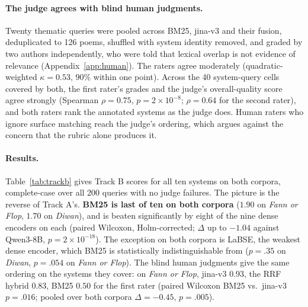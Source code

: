 \paragraph{The judge agrees with blind human judgments.} Twenty thematic queries were pooled across
BM25, jina-v3 and their fusion, deduplicated to 126 poems, shuffled with system identity removed,
and graded by two authors independently, who were told that lexical overlap is not evidence of
relevance (Appendix~\ref{app:human}). The raters agree moderately (quadratic-weighted
$\kappa{=}0.53$, $90\%$ within one point). Across the 40 system-query cells covered by both, the
first rater's grades and the judge's overall-quality score agree strongly (Spearman $\rho{=}0.75$,
$p{=}2\times10^{-8}$; $\rho{=}0.64$ for the second rater), and both raters rank the annotated
systems as the judge does. Human raters who ignore surface matching reach the judge's ordering,
which argues against the concern that the rubric alone produces it.

\paragraph{Results.} Table~\ref{tab:trackb} gives Track B scores for all ten systems on both
corpora, complete-case over all 200 queries with no judge failures. The picture is the reverse of
Track A's. \textbf{BM25 is last of ten on both corpora} ($1.90$ on \textit{Fann or Flop}, $1.70$ on
\textit{Diwan}), and is beaten significantly by eight of the nine dense encoders on each (paired
Wilcoxon, Holm-corrected; $\Delta$ up to $-1.04$ against Qwen3-8B, $p{=}2\times10^{-18}$). The
exception on both corpora is LaBSE, the weakest dense encoder, which BM25 is statistically
indistinguishable from ($p{=}.35$ on \textit{Diwan}, $p{=}.054$ on \textit{Fann or Flop}). The blind
human judgments give the same ordering on the systems they cover: on \textit{Fann or Flop}, jina-v3
$0.93$, the RRF hybrid $0.83$, BM25 $0.50$ for the first rater (paired Wilcoxon BM25 vs.\ jina-v3
$p{=}.016$; pooled over both corpora $\Delta{=}{-}0.45$, $p{=}.005$).


